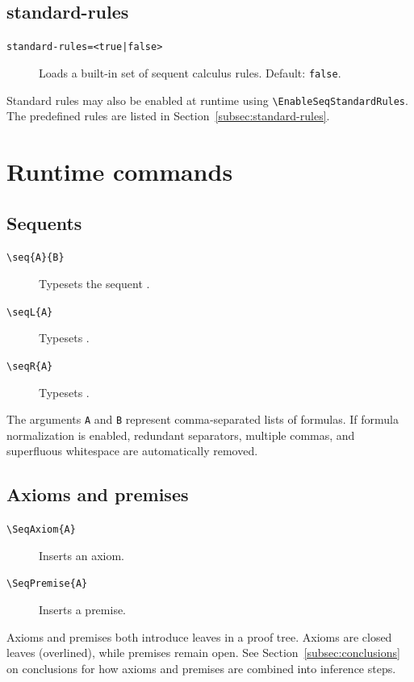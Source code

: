 \documentclass[a4paper,1pt]{article}
\begin{document}
\subsection{standard-rules}
\begin{description}
    \item[\texttt{standard-rules=<true|false>}]
        Loads a built-in set of sequent calculus rules. Default: \texttt{false}.
\end{description}
Standard rules may also be enabled at runtime using \texttt{\textbackslash EnableSeqStandardRules}. The predefined rules are listed in Section~\ref{subsec:standard-rules}.

\section{Runtime commands}
\label{sec:commands}

\subsection{Sequents}
\begin{description}
    \item[\texttt{\textbackslash seq\{A\}\{B\}}]
        Typesets the sequent .
    \item[\texttt{\textbackslash seqL\{A\}}]
        Typesets .
    \item[\texttt{\textbackslash seqR\{A\}}]
        Typesets .
\end{description}
The arguments \texttt{A} and \texttt{B} represent comma‑separated lists of formulas. If formula normalization is enabled, redundant separators, multiple commas, and superfluous whitespace are automatically removed.

\subsection{Axioms and premises} \begin{description}
    \item[\texttt{\textbackslash SeqAxiom\{A\}}]
        Inserts an axiom.
    \item[\texttt{\textbackslash SeqPremise\{A\}}]
        Inserts a premise.
\end{description}
Axioms and premises both introduce leaves in a proof tree. Axioms are closed leaves (overlined), while premises remain open.
See Section~\ref{subsec:conclusions} on conclusions for how axioms and premises are combined into inference steps.
\end{document}
